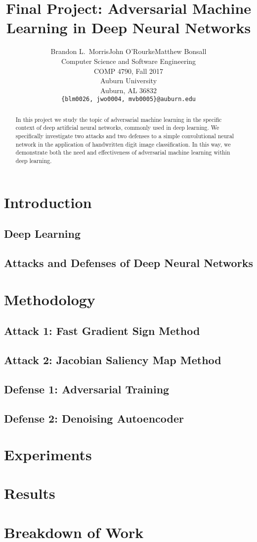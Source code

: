 \documentclass{article}
\title{Final Project: Adversarial Machine Learning in Deep Neural Networks}
\author{Brandon L.~Morris\qquad John O'Rourke\qquad Matthew Bonsall\\
  Computer Science and Software Engineering\\
  COMP 4790, Fall 2017\\
  Auburn University\\
  Auburn, AL 36832\\
  \texttt{\{blm0026, jwo0004, mvb0005\}@auburn.edu}}
\begin{document}
\maketitle


\begin{abstract}
In this project we study the topic of adversarial machine learning in the
specific context of deep artificial neural networks, commonly used in deep
learning. We specifically investigate two attacks and two defenses to a simple
convolutional neural network in the application of handwritten digit image
classification. In this way, we demonstrate both the need and effectiveness of
adversarial machine learning within deep learning.
\end{abstract}

\section{Introduction}

\subsection{Deep Learning}

\subsection{Attacks and Defenses of Deep Neural Networks}

\section{Methodology}

\subsection{Attack 1: Fast Gradient Sign Method}

\subsection{Attack 2: Jacobian Saliency Map Method}

\subsection{Defense 1: Adversarial Training}

\subsection{Defense 2: Denoising Autoencoder}

\section{Experiments}
\section{Results}
\section{Breakdown of Work}

%


\end{document}
